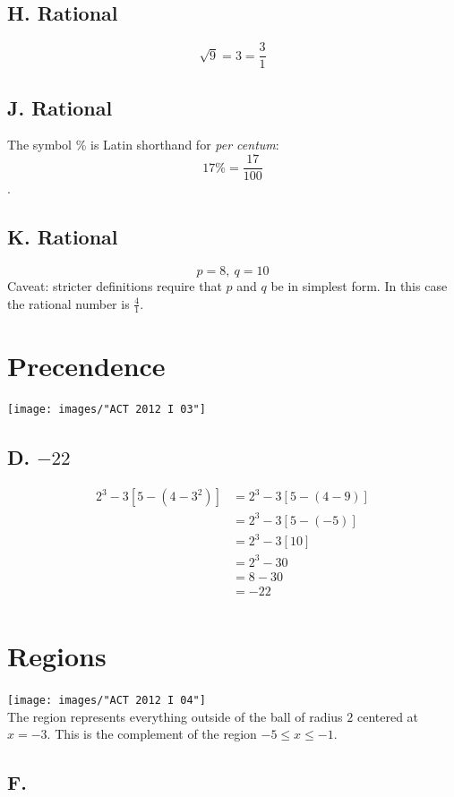 \documentclass[11pt, oneside]{article}
\begin{document}
\subsection{H. Rational}
$$\sqrt{9} = 3 = \frac{3}{1}$$
\subsection{J. Rational}
The symbol \% is Latin shorthand for \emph{per centum}: $$17\% = \frac{17}{100}$$.
\subsection{K. Rational}
$$p=8, \ q=10$$
Caveat: stricter definitions require that $p$ and $q$ be in simplest form. In this case the rational number is $\frac{4}{1}$.

\section{Precendence}
\texttt{[image: images/"ACT 2012 I 03"]}
\subsection{D. $-22$}
%
\begin{equation}
	\begin{split}
		2^{3}-3\left[5 - \left(4-3^{2}\right) \right] 
			&= 2^{3}-3\left[5 - \left(4-9\right) \right] \\
			&= 2^{3}-3\left[5 - \left(-5 \right) \right] \\
			&= 2^{3}-3\left[10 \right] \\
			&= 2^{3}-30 \\
			&= 8-30 \\
			&= -22 \\
	\end{split}
\end{equation}
%

\section{Regions}
\texttt{[image: images/"ACT 2012 I 04"]}\\
The region represents everything outside of the ball of radius $2$ centered at $x=-3$. This is the complement of the region $-5 \le x \le -1$.
\subsection{F.}
\end{document}
